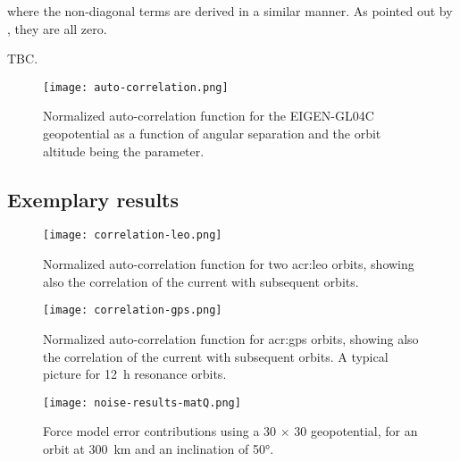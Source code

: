 where the non-diagonal terms are derived in a similar manner. As pointed out by \citet{nazarenko2010}, they are all zero.

TBC.

\begin{figure}[h!]
  \centering
  \texttt{[image: auto-correlation.png]}
  \caption{Normalized auto-correlation function for the EIGEN-GL04C geopotential as a function of angular separation and the orbit altitude being the parameter. \label{fig:auto-correlation}} 
\end{figure}

\subsection{Exemplary results}

\begin{figure}[h!]
  \centering
  \texttt{[image: correlation-leo.png]}
  \caption{Normalized auto-correlation function for two \gls{acr:leo} orbits, showing also the correlation of the current with subsequent orbits.\label{fig:correlation-leo}}
\end{figure}

\begin{figure}[h!]
  \centering
  \texttt{[image: correlation-gps.png]}
  \caption{Normalized auto-correlation function for \gls{acr:gps} orbits, showing also the correlation of the current with subsequent orbits. A typical picture for \SI{12}{\hour} resonance orbits.\label{fig:correlation-gps}}
\end{figure}

\begin{figure}[h!]
  \centering
  \texttt{[image: noise-results-matQ.png]}
  \caption{Force model error contributions using a 30 $\times$ 30 geopotential, for an orbit at \SI{300}{\kilo\metre} and an inclination of \ang{50;;}.  \label{fig:noise-contributions}}
\end{figure}


